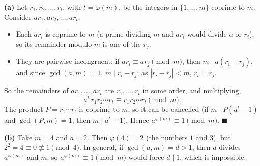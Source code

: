 \textbf{(a)} Let $r_1,r_2,\dots,r_t$, with $t=\varphi(m)$, be the integers in $\{1,\dots,m\}$ coprime to $m$. Consider $ar_1,ar_2,\dots,ar_t$.
\begin{itemize}
\item Each $ar_i$ is coprime to $m$ (a prime dividing $m$ and $ar_i$ would divide $a$ or $r_i$), so its remainder modulo $m$ is one of the $r_j$.
\item They are pairwise incongruent: if $ar_i\equiv ar_j\pmod m$, then $m\mid a(r_i-r_j)$, and since $\gcd(a,m)=1$, $m\mid r_i-r_j$; as $|r_i-r_j|<m$, $r_i=r_j$.
\end{itemize}
So the remainders of $ar_1,\dots,ar_t$ are $r_1,\dots,r_t$ in some order, and multiplying,
\[a^t\,r_1r_2\cdots r_t\equiv r_1r_2\cdots r_t\pmod m.\]
The product $P=r_1\cdots r_t$ is coprime to $m$, so it can be cancelled (if $m\mid P\left(a^t-1\right)$ and $\gcd(P,m)=1$, then $m\mid a^t-1$). Hence $a^{\varphi(m)}\equiv1\pmod m$. $\blacksquare$

\textbf{(b)} Take $m=4$ and $a=2$. Then $\varphi(4)=2$ (the numbers $1$ and $3$), but $2^2=4\equiv0\not\equiv1\pmod4$. In general, if $\gcd(a,m)=d>1$, then $d$ divides $a^{\varphi(m)}$ and $m$, so $a^{\varphi(m)}\equiv1\pmod m$ would force $d\mid1$, which is impossible.
